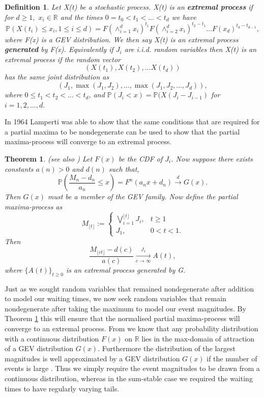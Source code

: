 \documentclass[honours,12pt]{unswthesis}
\newcommand{\R}{\mathbb{R}}
\newcommand{\PP}{\mathbb{P}}
\newcommand{\1}{\mathbf 1}
\newcommand{\Floor}[1]{{\lfloor {#1} \rfloor}}
\newcommand{\cd}{\overset{d}{\longrightarrow}}
\newtheorem{theorem}[equation]{Theorem}
\newtheorem{definition}[equation]{Definition}
\numberwithin{equation}{section}
\theoremstyle{definition}
\theoremstyle{remark}
\begin{document}
\begin{definition}
	Let X(t) be a stochastic process. X(t) is an \textbf{extremal process} if for $d\geq1,$ $x_i\in\R$ and the times $0=t_0<t_1<\ldots<t_d$ we have
	\[
	\PP(X(t_i)\leq x_i,1\leq i \leq d) = F(\wedge_{i=1}^d x_i)^{t_1} F(\wedge_{i=2}^d x_i)^{t_2-t_1}\ldots F(x_d)^{t_d-t_{d-1}},
	\]
	where F(x) is a GEV distribution. We then say X(t) is an extremal process \textbf{generated} by F(x). Equivalently if $J_i$ are i.i.d. random variables then X(t) is an extremal process if the random vector
	\[
		\left( X(t_1), X(t_2), \ldots X(t_d)\right)
	\]
	has the same joint distribution as 
	\[
		\left(J_1, \max(J_1,J_2), \ldots, \max(J_1,J_2,\ldots,J_d) \right),
	\]
	where $0\leq t_1<t_2<\ldots<t_d$, and $\PP(J_i<x)=\PP(X(J_i-J_{i-1})$ for $i=1,2,\ldots,d.$\\
\end{definition}
\noindent In 1964 Lamperti \cite{Lamperti1964} was able to show that the same conditions that are required for a partial maxima to be nondegenerate can be used to show that the partial maxima-process will converge to an extremal process.\\
\begin{theorem}\cite[Th~3.2]{Lamperti1964}\label{th:extclt} (see also \cite[Th~2]{Resnick1974})
Let $F(x)$ be the CDF of $J_i$. Now suppose there exists constants $a(n)>0$ and $d(n)$ such that,
\[
	\PP\left(\frac{M_n -d_n}{a_n} \leq x \right)=F^n\left(a_nx+d_n\right) \cd G(x) .
\]
Then $G(x)$ must be a member of the GEV family. Now define the partial maxima-process as
\[
	M_\Floor{t}:=
	\begin{cases}
	      \bigvee_{i=1}^{\lfloor{t}\rfloor} J_i, &\textrm{$t\geq 1$}\\
	         J_1, &\textrm{$0<t<1.$}
	\end{cases}
\]
Then 
\[
\frac{M_\Floor{ct}-d(c)}{a(c)} \xrightarrow[c\to \infty]{J_1} A(t),
\]
where $\{A(t)\}_{t\geq0}$ is an extremal process generated by G.\\
\end{theorem}
\noindent Just as we sought random variables that remained nondegenerate after addition to model our waiting times, we now seek random variables that remain nondegenerate after taking the maximum to model our event magnitudes. By Theorem \ref{th:extclt} this will ensure that the normalised partial maxima-process will converge to an extremal process. From \cite{beirlant06Book} we know that any probability distribution with a continuous distribution $F(x)$ on $\R$ lies in the max-domain of attraction of a GEV distribution $G(x)$. Furthermore the distribution of the largest magnitudes is well approximated by a GEV distribution $G(x)$ if the number of events is large \cite{ColesBook}. Thus we simply require the event magnitudes to be drawn from a continuous distribution, whereas in the sum-stable case we required the waiting times to have regularly varying tails.
\end{document}
